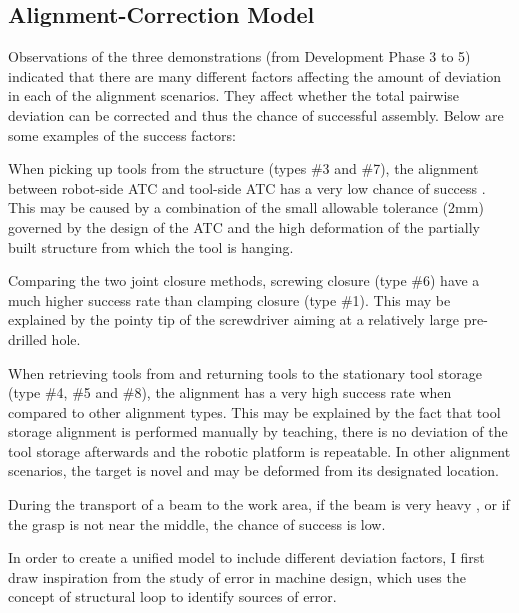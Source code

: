 \subsection{Alignment-Correction Model}
\label{subsection:new-hypo-alignment-correction-model}

Observations of the three demonstrations (from Development Phase 3 to 5) indicated that there are many different factors affecting the amount of deviation in each of the alignment scenarios. They affect whether the total pairwise deviation can be corrected and thus the chance of successful assembly. Below are some examples of the success factors:

\begin{description}[style=unboxed] %
	\item [Tight tolerance, deviation of partially assembled structure] When picking up tools from the structure (types \#3 and \#7), the alignment between robot-side ATC and tool-side ATC has a very low chance of success . This may be caused by a combination of the small allowable tolerance (2mm) governed by the design of the ATC and the high deformation of the partially built structure from which the tool is hanging. 

	\item [Correction range] Comparing the two joint closure methods, screwing closure (type \#6) have a much higher success rate than clamping closure (type \#1). This may be explained by the pointy tip of the screwdriver aiming at a relatively large pre-drilled hole.

	\item [Deviation] When retrieving tools from and returning tools to the stationary tool storage (type \#4, \#5 and \#8), the alignment has a very high success rate when compared to other alignment types. This may be explained by the fact that tool storage alignment is performed manually by teaching, there is no deviation of the tool storage afterwards and the robotic platform is repeatable. In other alignment scenarios, the target is novel and may be deformed from its designated location.

	\item [Payload] During the transport of a beam to the work area, if the beam is very heavy , or if the grasp is not near the middle, the chance of success is low. 

\end{description}
In order to create a unified model to include different deviation factors, I first draw inspiration from the study of error in machine design, which uses the concept of structural loop to identify sources of error.

